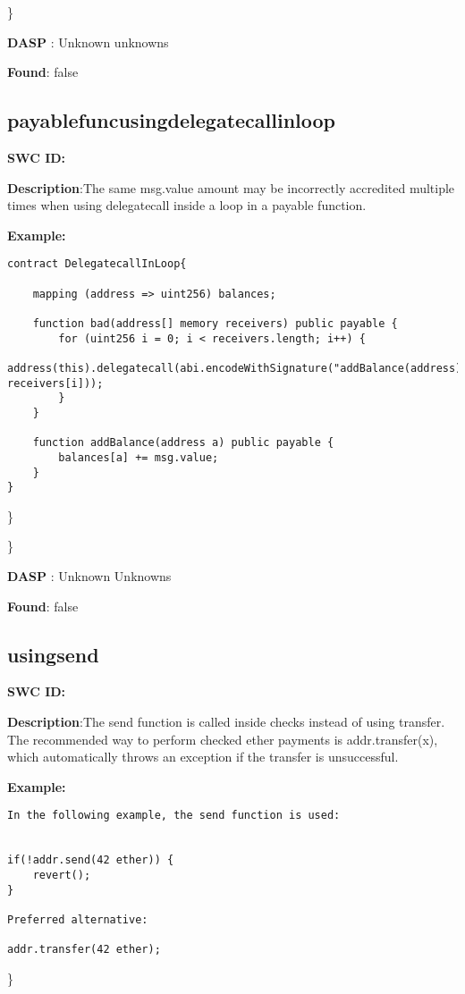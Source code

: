 \documentclass{article}
\begin{document}
\} 

\textbf{DASP} : Unknown unknowns

\textbf{Found}: false

\subsection{payable\textunderscore func\textunderscore using\textunderscore delegatecall\textunderscore in\textunderscore loop} 
\textbf{SWC \textunderscore ID:} 

\textbf{Description}:The same msg.value amount may be incorrectly accredited multiple times when using delegatecall inside a loop in a payable function.


\textbf{Example:} 
\begin{verbatim}
contract DelegatecallInLoop{

    mapping (address => uint256) balances;

    function bad(address[] memory receivers) public payable {
        for (uint256 i = 0; i < receivers.length; i++) {
            address(this).delegatecall(abi.encodeWithSignature("addBalance(address)", receivers[i]));
        }
    }

    function addBalance(address a) public payable {
        balances[a] += msg.value;
    }
}

\end{verbatim}\} 

\} 

\textbf{DASP} : Unknown Unknowns

\textbf{Found}: false

\subsection{using\textunderscore send} 
\textbf{SWC \textunderscore ID:} 

\textbf{Description}:The send function is called inside checks instead of using transfer. The recommended way to perform checked ether payments is addr.transfer(x), which automatically throws an exception if the transfer is unsuccessful.


\textbf{Example:} 
\begin{verbatim}
In the following example, the send function is used:


if(!addr.send(42 ether)) {
    revert();
}

Preferred alternative:

addr.transfer(42 ether);

\end{verbatim}\} 
\end{document}
